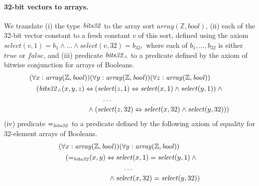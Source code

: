 \paragraph{32-bit vectors to arrays.}
We translate
(i) the type $\mathit{bits32}$ to the array sort $\mathit{array}(\mathbb{Z},\mathit{bool})$,
(ii) each of the 32-bit vector constant to a fresh constant $v$ of this sort, defined using the axiom $\mathit{select}(v,1)=b_1\wedge\ldots\wedge\allowbreak\mathit{select}(v, 32)=b_{32},$ where each of $b_1,\ldots,b_{32}$ is either $\mathit{true}$ or $\mathit{false}$, and
(iii) predicate $\mathit{bits32}_\wedge$ to a predicate defined by the axiom of bitwise conjunction for arrays of Booleans.
\begin{equation*}
\begin{aligned}
&(\forall x:\mathit{array}(\mathbb{Z},\mathit{bool}))(\forall y:\mathit{array}(\mathbb{Z},\mathit{bool}))(\forall z:\mathit{array}(\mathbb{Z},\mathit{bool}))\\
&\quad\begin{aligned}
      (\mathit{bits32}_\wedge(x,y,z)\Leftrightarrow\:&(\mathit{select}(z,1)\Leftrightarrow\mathit{select}(x,1)\wedge\mathit{select}(y,1))\:\wedge\\
      &\quad\ldots\\
      \wedge\:&(\mathit{select}(z,32)\Leftrightarrow\mathit{select}(x,32)\wedge\mathit{select}(y,32)))
      \end{aligned}
\end{aligned}
\end{equation*}
(iv) predicate $\mathit{=}_{\mathit{bits32}}$ to a predicate defined by the following axiom of equality for 32-element arrays of Booleans.
\begin{equation*}
\begin{aligned}
&(\forall x:\mathit{array}(\mathbb{Z},\mathit{bool}))(\forall y:\mathit{array}(\mathbb{Z},\mathit{bool}))\\
&\quad\begin{aligned}
      (\mathit{=}_{\mathit{bits32}}(x, y)\Leftrightarrow\:&\mathit{select}(x,1)=\mathit{select}(y,1)\:\wedge\\
      &\quad\ldots\\
      \wedge\:&\mathit{select}(x, 32)=\mathit{select}(y,32))
      \end{aligned}
\end{aligned}
\end{equation*}


